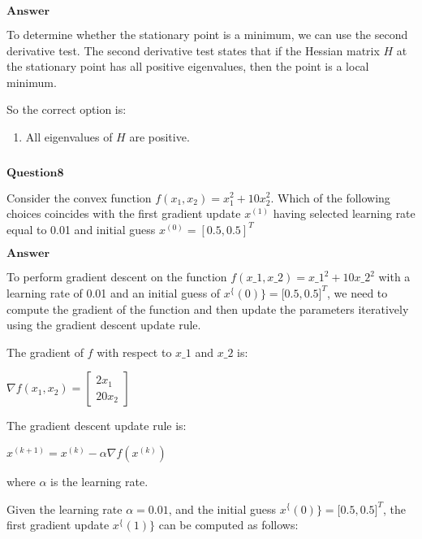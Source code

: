 \documentclass[11pt]{article}
\makeatletter
\providecommand{\tightlist}{%
      \setlength{\itemsep}{0pt}\setlength{\parskip}{0pt}}
\newcommand{\boxspacing}{\kern\kvtcb@left@rule\kern\kvtcb@boxsep}
\newcommand{\prompt}[4]{
        {\ttfamily\llap{{\color{#2}[#3]:\hspace{3pt}#4}}\vspace{-\baselineskip}}
    }
\makeatother
\begin{document}
$\textbf{Answer}$

    To determine whether the stationary point is a minimum, we can use the
second derivative test. The second derivative test states that if the
Hessian matrix $ H $ at the stationary point has all positive
eigenvalues, then the point is a local minimum.

So the correct option is:

\begin{enumerate}
\def\labelenumi{\alph{enumi}.}
\tightlist
\item
  All eigenvalues of $ H $ are positive.
\end{enumerate}

    \begin{tcolorbox}[breakable, size=fbox, boxrule=1pt, pad at break*=1mm,colback=cellbackground, colframe=cellborder]
\prompt{In}{incolor}{ }{\boxspacing}
\begin{Verbatim}[commandchars=\\\{\}]

\end{Verbatim}
\end{tcolorbox}

    $\textbf{Question8}$

Consider the convex function $f(x_1,x_2)=x^{2}_1+10x^{2}_2$. Which of
the following choices coincides with the first gradient update $x^(1)$
having selected learning rate equal to 0.01 and initial guess
$x^(0)=[0.5,0.5]^T$

$\textbf{Answer}$

    To perform gradient descent on the function $ f(x\_1, x\_2) = x\_1^2
+ 10x\_2^2 $ with a learning rate of 0.01 and an initial guess of $
x^\{(0)\} = {[}0.5, 0.5{]}^T $, we need to compute the gradient
of the function and then update the parameters iteratively using the
gradient descent update rule.

The gradient of $ f $ with respect to $ x\_1 $ and $ x\_2 $ is:

$\nabla f(x_1, x_2) = \begin{bmatrix} 2x_1 \\ 20x_2 \end{bmatrix}$

The gradient descent update rule is:

$x^{(k+1)} = x^{(k)} - \alpha \nabla f(x^{(k)})$

where $ \alpha $ is the learning rate.

Given the learning rate $ \alpha = 0.01 $, and the initial guess $
x^\{(0)\} = {[}0.5, 0.5{]}^T $, the first gradient update $
x^\{(1)\} $ can be computed as follows:
\end{document}
